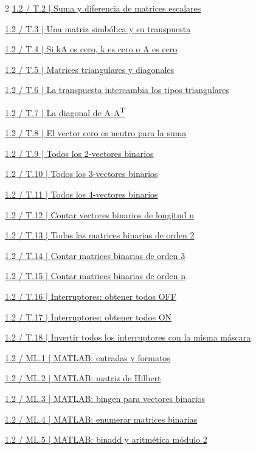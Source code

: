 \documentclass[11pt,a4paper,landscape]{article}
\begin{document}
\begin{multicols}{2}
\hyperlink{1.2-T.2}{1.2 / T.2 | Suma y diferencia de matrices escalares}\par
\hyperlink{1.2-T.3}{1.2 / T.3 | Una matriz simbólica y su transpuesta}\par
\hyperlink{1.2-T.4}{1.2 / T.4 | Si kA es cero, k es cero o A es cero}\par
\hyperlink{1.2-T.5}{1.2 / T.5 | Matrices triangulares y diagonales}\par
\hyperlink{1.2-T.6}{1.2 / T.6 | La transpuesta intercambia los tipos triangulares}\par
\hyperlink{1.2-T.7}{1.2 / T.7 | La diagonal de A-A\textsuperscript{T}}\par
\hyperlink{1.2-T.8}{1.2 / T.8 | El vector cero es neutro para la suma}\par
\hyperlink{1.2-T.9}{1.2 / T.9 | Todos los 2-vectores binarios}\par
\hyperlink{1.2-T.10}{1.2 / T.10 | Todos los 3-vectores binarios}\par
\hyperlink{1.2-T.11}{1.2 / T.11 | Todos los 4-vectores binarios}\par
\hyperlink{1.2-T.12}{1.2 / T.12 | Contar vectores binarios de longitud n}\par
\hyperlink{1.2-T.13}{1.2 / T.13 | Todas las matrices binarias de orden 2}\par
\hyperlink{1.2-T.14}{1.2 / T.14 | Contar matrices binarias de orden 3}\par
\hyperlink{1.2-T.15}{1.2 / T.15 | Contar matrices binarias de orden n}\par
\hyperlink{1.2-T.16}{1.2 / T.16 | Interruptores: obtener todos OFF}\par
\hyperlink{1.2-T.17}{1.2 / T.17 | Interruptores: obtener todos ON}\par
\hyperlink{1.2-T.18}{1.2 / T.18 | Invertir todos los interruptores con la misma máscara}\par
\hyperlink{1.2-ML.1}{1.2 / ML.1 | MATLAB: entradas y formatos}\par
\hyperlink{1.2-ML.2}{1.2 / ML.2 | MATLAB: matriz de Hilbert}\par
\hyperlink{1.2-ML.3}{1.2 / ML.3 | MATLAB: bingen para vectores binarios}\par
\hyperlink{1.2-ML.4}{1.2 / ML.4 | MATLAB: enumerar matrices binarias}\par
\hyperlink{1.2-ML.5}{1.2 / ML.5 | MATLAB: binadd y aritmética módulo 2}\par
\end{multicols}
\newpage{}\hypertarget{1.1-1}{}
\end{document}
